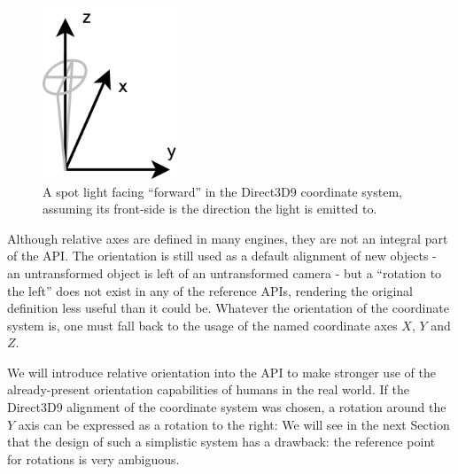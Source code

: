 	\begin{figure}[htbp]
		\centering
		\includegraphics[width=4cm]{images/rotatedspotlight.png}
		\caption{A spot light facing ``forward'' in the Direct3D9 coordinate system, assuming its front-side is the direction the light is emitted to.}
		\label{fig:RotatedSpotLight}
	\end{figure}

	Although relative axes are defined in many engines, they are not an integral part of the API. The orientation is still used as a default alignment of new objects - an untransformed object is left of an untransformed camera - but a ``rotation to the left'' does not exist in any of the reference APIs, rendering the original definition less useful than it could be. Whatever the orientation of the coordinate system is, one must fall back to the usage of the named coordinate axes $X$, $Y$ and $Z$.

	We will introduce relative orientation into the API to make stronger use of the already-present orientation capabilities of humans in the real world. If the Direct3D9 alignment of the coordinate system was chosen, a rotation around the $Y$ axis can be expressed as a rotation to the right:  We will see in the next Section that the design of such a simplistic system has a drawback: the reference point for rotations is very ambiguous.


